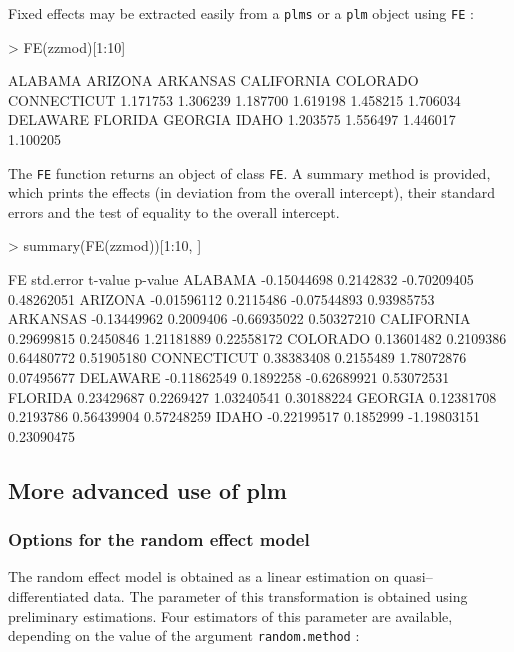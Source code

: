 \documentclass{article}
\begin{document}
Fixed effects may be extracted easily from a \texttt{plms} or a
\texttt{plm} object using  \texttt{FE} :

\begin{Schunk}
\begin{Sinput}
> FE(zzmod)[1:10]
\end{Sinput}
\begin{Soutput}
    ALABAMA     ARIZONA    ARKANSAS  CALIFORNIA    COLORADO CONNECTICUT 
   1.171753    1.306239    1.187700    1.619198    1.458215    1.706034 
   DELAWARE     FLORIDA     GEORGIA       IDAHO 
   1.203575    1.556497    1.446017    1.100205 
\end{Soutput}
\end{Schunk}

The \texttt{FE} function returns an object of class \texttt{FE}. A
summary method is provided, which prints the effects (in deviation
from the overall intercept), their standard
errors and the test of equality to the overall intercept.

\begin{Schunk}
\begin{Sinput}
> summary(FE(zzmod))[1:10, ]
\end{Sinput}
\begin{Soutput}
                     FE std.error     t-value    p-value
ALABAMA     -0.15044698 0.2142832 -0.70209405 0.48262051
ARIZONA     -0.01596112 0.2115486 -0.07544893 0.93985753
ARKANSAS    -0.13449962 0.2009406 -0.66935022 0.50327210
CALIFORNIA   0.29699815 0.2450846  1.21181889 0.22558172
COLORADO     0.13601482 0.2109386  0.64480772 0.51905180
CONNECTICUT  0.38383408 0.2155489  1.78072876 0.07495677
DELAWARE    -0.11862549 0.1892258 -0.62689921 0.53072531
FLORIDA      0.23429687 0.2269427  1.03240541 0.30188224
GEORGIA      0.12381708 0.2193786  0.56439904 0.57248259
IDAHO       -0.22199517 0.1852999 -1.19803151 0.23090475
\end{Soutput}
\end{Schunk}


\subsection{More advanced use of plm}


\subsubsection{Options for the random effect model}

The random effect model is obtained as a linear estimation on
quasi--differentiated  data. The parameter of this transformation is
obtained using preliminary estimations. Four estimators of this
parameter are available, depending on the value of the argument \texttt{random.method}  :
\end{document}
